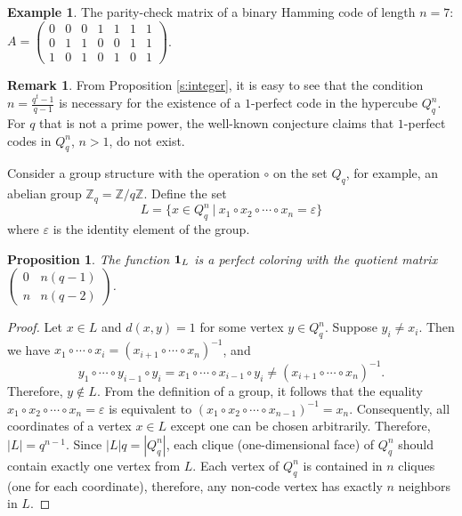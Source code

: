 \documentclass[11pt]{article}
\newtheorem{claim}{Proposition}[section]
\theoremstyle{definition}
\newtheorem{remark}{Remark}[section]
\newtheorem{example}{Example}[section]
\begin{document}
\begin{example}
The parity-check matrix of a binary Hamming code of length $n=7$:
$A=\begin{pmatrix}
0 & 0 & 0 & 1& 1 & 1&1 \\
0 & 1 & 1 & 0 & 0 & 1 & 1\\
1 & 0 & 1 & 0 & 1 & 0 & 1
\end{pmatrix}$.
\end{example}

\begin{remark} From Proposition \ref{s:integer},  it is easy to see that the condition
$n=\frac{q^t-1}{q-1}$ is necessary for the existence of a
$1$-perfect code in the hypercube $Q^n_q$. For $q$ that is not  a prime power, the well-known  conjecture claims  that $1$-perfect codes in
$Q^n_q$, $n>1$, do not exist. \label{PCprob}
\end{remark} 

Consider a group structure with the operation $\circ$ on the set $Q_q$,
for example, an  abelian group $\mathbb{Z}_q=\mathbb{Z}/q\mathbb{Z}$. Define the set $$L=\{x\in Q_q^n \ |\ x_1\circ
x_2\circ\cdots\circ x_n=\varepsilon\}$$ where $\varepsilon$ is the identity element of the group.
\begin{claim}\label{s:integer11}
The function ${\bf 1}_{L}$ is a perfect coloring with the quotient matrix
 $\begin{pmatrix}
0 & n(q-1) \\
n & n(q-2)
\end{pmatrix}$. \end{claim}
\begin{proof}
Let $x\in L$ and $d(x,y)=1$ for some vertex $y\in Q^n_q$.
Suppose $y_i\neq x_i$. Then we have $x_1\circ\cdots \circ x_i=
(x_{i+1}\circ\cdots\circ x_n)^{-1}$, and $$y_1\circ\cdots \circ y_{i-1}\circ y_i=x_1\circ\cdots\circ x_{i-1} \circ y_i \neq
(x_{i+1}\circ\cdots\circ x_n)^{-1}. $$ Therefore, $y\not \in L$. From the
definition of a group, it follows that the equality $x_1\circ
x_2\circ\cdots\circ x_n =\varepsilon$ is equivalent to $(x_1\circ
x_2\circ\cdots\circ x_{n-1})^{-1}=x_n$. Consequently, all coordinates
of a vertex $x\in L$ except one can be chosen arbitrarily. Therefore,
$|L|=q^{n-1}$. Since $|L|q=|Q_q^n|$, each clique (one-dimensional
face)  of $Q^n_q$ should contain exactly one vertex from $L$. Each
vertex of  $Q^n_q$ is contained in $n$ cliques (one for each coordinate),
therefore, any non-code vertex has exactly $n$ neighbors in $L$.\end{proof}
\end{document}
